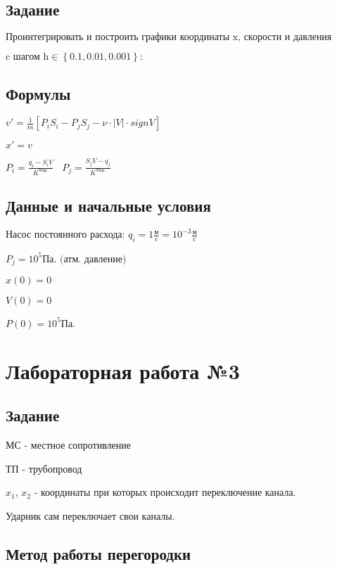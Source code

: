 \documentclass[12pt, a4paper]{article}
\begin{document}
\subsection{Задание}
$ \text{Проинтегрировать и построить графики координаты x, скорости и давления} $

$ \text{c шагом h} \in \left\{ 0.1, 0.01, 0.001 \right\} : $




\subsection{Формулы}

$ v' = \frac{1}{m}[P_i S_i - P_j S_j - \nu \cdot |V| \cdot sign V] $

$ x' = v $

$ P_i = \frac{q_i - S_i V}{K^{\text{Упр.}}} \> \> \> \> P_j = \frac{S_j V - q_j}{K^{\text{Упр.}}}$

\subsection{Данные и начальные условия}

$\text{Насос постоянного расхода: } q_i = 1 \frac{\text{м}}{\text{c}} = 10^{-3} \frac{\text{м}}{\text{c}}$

$P_j = 10^5 \text{Па. (атм. давление)}$

$ x(0) = 0$

$ V(0) = 0$

$ P(0) = 10^5 \text{Па.} $








\section{Лабораторная работа №3}

\subsection{Задание}

МС - местное сопротивление

ТП - трубопровод

$x_1$, $x_2$ - координаты при которых происходит переключение канала.

Ударник сам переключает свои каналы.




\subsection{Метод работы перегородки}
\end{document}
